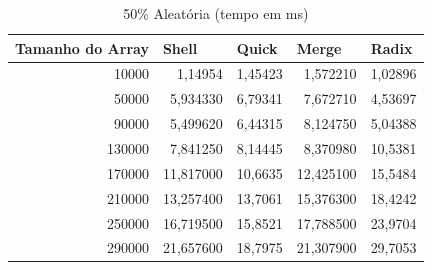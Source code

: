 \documentclass[a4paper, 12pt]{article}
\begin{document}
\begin{longtable}[c]{@{}rrrrr@{}}
	\caption{50\% Aleatória (tempo em ms)}
	\label{tab:aleatoria502-table}\\
	\toprule
	\multicolumn{1}{l}{\textbf{Tamanho do Array}} & \multicolumn{1}{l}{\textbf{Shell}} & \multicolumn{1}{l}{\textbf{Quick}} & \multicolumn{1}{l}{\textbf{Merge}} & \multicolumn{1}{l}{\textbf{Radix}} \\* \midrule
	\endfirsthead
	\endhead
	\multicolumn{1}{|r|}{10000}                   & \multicolumn{1}{r|}{1,14954}       & \multicolumn{1}{r|}{1,45423}       & \multicolumn{1}{r|}{1,572210}      & \multicolumn{1}{r|}{1,02896}       \\* \midrule
	\multicolumn{1}{|r|}{50000}                   & \multicolumn{1}{r|}{5,934330}      & \multicolumn{1}{r|}{6,79341}       & \multicolumn{1}{r|}{7,672710}      & \multicolumn{1}{r|}{4,53697}       \\* \midrule
	\multicolumn{1}{|r|}{90000}                   & \multicolumn{1}{r|}{5,499620}      & \multicolumn{1}{r|}{6,44315}       & \multicolumn{1}{r|}{8,124750}      & \multicolumn{1}{r|}{5,04388}       \\* \midrule
	\multicolumn{1}{|r|}{130000}                  & \multicolumn{1}{r|}{7,841250}      & \multicolumn{1}{r|}{8,14445}       & \multicolumn{1}{r|}{8,370980}      & \multicolumn{1}{r|}{10,5381}       \\* \midrule
	\multicolumn{1}{|r|}{170000}                  & \multicolumn{1}{r|}{11,817000}     & \multicolumn{1}{r|}{10,6635}       & \multicolumn{1}{r|}{12,425100}     & \multicolumn{1}{r|}{15,5484}       \\* \midrule
	\multicolumn{1}{|r|}{210000}                  & \multicolumn{1}{r|}{13,257400}     & \multicolumn{1}{r|}{13,7061}       & \multicolumn{1}{r|}{15,376300}     & \multicolumn{1}{r|}{18,4242}       \\* \midrule
	\multicolumn{1}{|r|}{250000}                  & \multicolumn{1}{r|}{16,719500}     & \multicolumn{1}{r|}{15,8521}       & \multicolumn{1}{r|}{17,788500}     & \multicolumn{1}{r|}{23,9704}       \\* \midrule
	\multicolumn{1}{|r|}{290000}                  & \multicolumn{1}{r|}{21,657600}     & \multicolumn{1}{r|}{18,7975}       & \multicolumn{1}{r|}{21,307900}     & \multicolumn{1}{r|}{29,7053}       \\* \midrule

\end{longtable}
\end{document}
